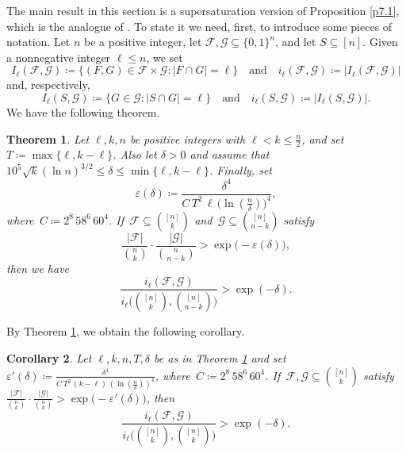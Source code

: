 \documentclass[10pt]{amsart}
\newtheorem{thm}{Theorem}[section]
\newtheorem{cor}[thm]{Corollary}
\theoremstyle{remark}
\newcommand{\ee}{\varepsilon}
\newcommand{\mik}{\leqslant}
\newcommand{\Fcal}{\mathcal{F}}
\newcommand{\Gcal}{\mathcal{G}}
\begin{document}
The main result in this section is a supersaturation version of Proposition \ref{p7.1},
which is the analogue of \cite[Theorem 1.14]{FR87}. To state it we need, first,
to introduce some pieces of notation. Let $n$ be a positive integer, let
$\Fcal,\Gcal\subseteq \{0,1\}^n$, and let $S\subseteq [n]$.
Given a nonnegative integer $\ell\mik n$, we set
\begin{equation} \label{e9.1}
I_\ell(\Fcal,\Gcal)\coloneqq \big\{(F,G)\in\Fcal\times\Gcal: |F\cap G|=\ell\big\}
\ \ \ \text{ and } \ \ \ i_\ell(\Fcal,\Gcal)\coloneqq |I_\ell(\Fcal,\Gcal)|
\end{equation}
and, respectively,
\begin{equation} \label{e9.2}
I_\ell(S,\Gcal)\coloneqq \big\{G\in\Gcal: |S\cap G|=\ell\big\}
\ \ \ \text{ and } \ \ \ i_\ell(S,\Gcal)\coloneqq |I_\ell(S,\Gcal)|.
\end{equation}
We have the following theorem.
\begin{thm} \label{t9.1}
Let $\ell,k,n$ be positive integers with $\ell< k\mik \frac{n}{2}$, and set $T\coloneqq \max\{\ell,k-\ell\}$.
Also let $\delta>0$ and assume that $10^5 \sqrt{k} (\ln n)^{3/2}\mik \delta \mik \min\{\ell,k-\ell\}$. Finally, set
\begin{equation} \label{e9.3}
\ee(\delta)\coloneqq \frac{\delta^4}{C\, T^2\, \ell\,\big(\ln(\frac{n}{\delta})\big)^4},
\end{equation}
where\, $C\coloneqq 2^{8}\, 58^6\, 60^4$. If\, $\Fcal\subseteq\binom{[n]}{k}$ and\,
$\Gcal\subseteq \binom{[n]}{n-k}$ satisfy
\begin{equation} \label{e9.4}
\frac{|\Fcal|}{\binom{n}{k}}\cdot\frac{|\Gcal|}{\binom{n}{n-k}}>\exp\big(-\ee(\delta)\big),
\end{equation}
then we have
\begin{equation} \label{e9.5}
\frac{i_{\ell}(\Fcal,\Gcal)}{i_{\ell}\big(\binom{[n]}{k},\binom{[n]}{n-k}\big)}> \exp\left(-\delta\right).
\end{equation}
\end{thm}
By Theorem \ref{t9.1}, we obtain the following corollary.
\begin{cor} \label{9.cor.new}
Let $\ell,k,n, T, \delta$ be as in Theorem \emph{\ref{t9.1}} and set
$\ee'(\delta)\coloneqq \frac{\delta^4}{C\, T^2\, (k-\ell)\,(\ln(\frac{n}{\delta}))^4}$,
where\, $C\coloneqq 2^{8}\, 58^6\, 60^4$. If\, $\Fcal, \Gcal\subseteq\binom{[n]}{k}$ satisfy
$\frac{|\Fcal|}{\binom{n}{k}}\cdot\frac{|\Gcal|}{\binom{n}{k}}>\exp\big(-\ee'(\delta)\big)$, then
\begin{equation} \label{en.9.1}
\frac{i_{\ell}(\Fcal,\Gcal)}{i_{\ell}\big(\binom{[n]}{k},\binom{[n]}{k}\big)}> \exp\left(-\delta\right).
\end{equation}
\end{cor}
\end{document}
